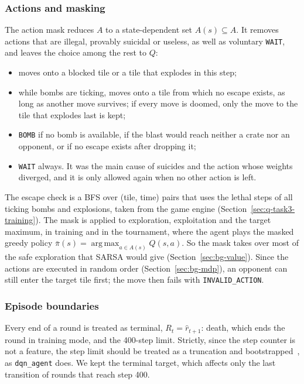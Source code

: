 \documentclass[11pt]{article}
\newcommand{\code}[1]{\texttt{#1}}
\begin{document}
\subsubsection{Actions and masking}
The action mask reduces $A$ to a state-dependent set $A(s) \subseteq A$. It removes
actions that are illegal, provably suicidal or useless, as well as voluntary \code{WAIT},
and leaves the choice among the rest to $Q$:
\begin{itemize}\setlength{\itemsep}{1pt}
  \item moves onto a blocked tile or a tile that explodes in this step;
  \item while bombs are ticking, moves onto a tile from which no escape exists, as long
        as another move survives; if every move is doomed, only the move to the tile
        that explodes last is kept;
  \item \code{BOMB} if no bomb is available, if the blast would reach neither a crate
        nor an opponent, or if no escape exists after dropping it;
  \item \code{WAIT} always. It was the main cause of suicides and the action whose
        weights diverged, and it is only allowed again when no other action is left.
\end{itemize}
The escape check is a BFS over (tile, time) pairs that uses the lethal steps of all
ticking bombs and explosions, taken from the game engine (Section~\ref{sec:q-task3-training}).
The mask is applied to exploration, exploitation and the target maximum, in training and
in the tournament, where the agent plays the masked greedy policy
$\bar\pi(s) = \operatorname*{arg\,max}_{a \in A(s)} Q(s,a)$. So the mask takes over most
of the safe exploration that SARSA would give (Section~\ref{sec:bg-value}). Since the
actions are executed in random order (Section~\ref{sec:bg-mdp}), an opponent can still
enter the target tile first; the move then fails with \code{INVALID\_ACTION}.
 
\subsubsection{Episode boundaries}
Every end of a round is treated as terminal, $R_t = \hat r_{t+1}$: death, which ends
the round in training mode, and the 400-step limit. Strictly, since the step counter is
not a feature, the step limit should be treated as a truncation and
bootstrapped~\cite{pardo2018}, as \code{dqn\_agent} does. We kept the terminal target,
which affects only the last transition of rounds that reach step 400.
 
\end{document}

